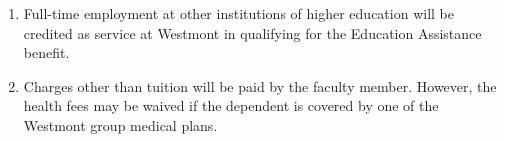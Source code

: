 \documentclass[letterpaper, 11pt]{article}
\begin{document}
\begin{enumerate}[label=\alph*)]
{\begin{enumerate}[label=\arabic*)]
							Completed service* (prior to beginning of semester)
							Benefit
							Less than 4 years
							None
							4 years
							25\% of tuition
							5 years
							50\% of tuition
							6 years
							75\% of tuition
							7 years
							100\% of tuition

							*Full-time employment at other institutions of higher education immediately prior to beginning full-time employment at Westmont will be credited as service in qualifying for the Education Assistance benefits for dependent children.  Employees who began full-time employment prior to January 1, 2002 will be credited with an additional four years of service eligibility for this benefit.
							\item{Full-time employment at other institutions of higher education will be credited as service at Westmont in qualifying for the Education Assistance benefit.}
							\item{Charges other than tuition will be paid by the faculty member.  However, the health fees may be waived if the dependent is covered by one of the Westmont group medical plans.}
						\end{enumerate}
					}


\end{enumerate}
\end{document}
